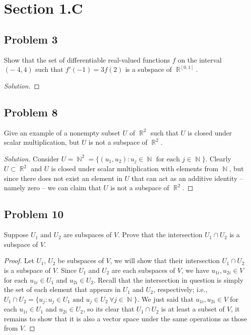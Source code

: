\documentclass[letterpaper, 12pt]{amsart}
\DeclareMathOperator{\N}{\mathbb{N}}
\DeclareMathOperator{\R}{\mathbb{R}}
\theoremstyle{definition}  %
\begin{document}
	\section*{Section 1.C}	
		\subsection*{Problem 3}
		Show that the set of differentiable real-valued functions $f$ on the interval $(-􏰈4, 4)$ such that $f'(-1) = 3f(2)$ is a subspace of $\R^{[0,1]}$.

		\begin{proof}[Solution]
		\end{proof}

		\subsection*{Problem 8}
		Give an example of a nonempty subset $U$ of $\R^{2}$ such that $U$ is closed under scalar multiplication, but $U$ is not a subspace of $\R^{2}$.

		\begin{proof}[Solution]
		Consider $U = \N^{2} = \{ (u_{1},u_{2}) : \text{$u_{j} \in \N$ for each $j \in \N$} \}$.
		Clearly $U \subset \R^{2}$ and $U$ is closed under scalar multiplication with elements from $\N$, but since there does not exist an element in $U$ that can act as an additive identity -- namely zero -- we can claim that $U$ is not a subspace of $\R^{2}$.
		\end{proof}	

		\subsection*{Problem 10}
		Suppose $U_{1}$ and $U_{2}$ are subspaces of $V$. 
		Prove that the intersection $U_{1} \cap U_{2}$ is a subspace of $V$.

		\begin{proof}
		Let $U_{1}$, $U_{2}$ be subspaces of $V$, we will show that their intersection $U_{1} \cap U_{2}$ is a subspace of $V$.
		Since $U_{1}$ and $U_{2}$ are each subspaces of $V$, we have $u_{1i}, u_{2i} \in V$ for each $u_{1i} \in U_{1}$ and $u_{2i} \in U_{2}$.
		Recall that the intersection in question is simply the set of each element that appears in $U_{1}$ and $U_{2}$, respectively; i.e., $U_{1} \cap U_{2} = \{ u_{j} : \text{$u_{j} \in U_{1}$ and $u_{j} \in U_{2} \ \forall j \in \N$} \}$.
		We just said that $u_{1i}, u_{2i} \in V$ for each $u_{1i} \in U_{1}$ and $u_{2i} \in U_{2}$, so its clear that $U_{1} \cap U_{2}$ is at least a subset of $V$, it remains to show that it is also a vector space under the same operations as those from $V$.

		
		\end{proof}
\end{document}
